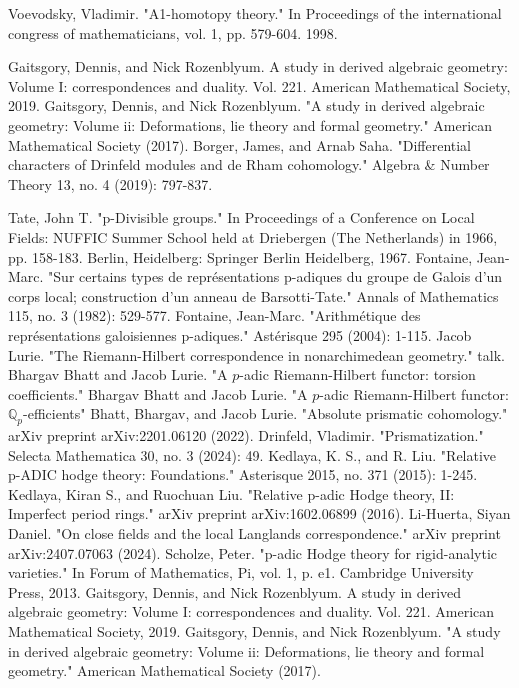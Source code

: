 \documentclass[12pt]{article}
\theoremstyle{definition}
\begin{document}
\begin{thebibliography}{}
 Voevodsky, Vladimir. "A1-homotopy theory." In Proceedings of the international congress of mathematicians, vol. 1, pp. 579-604. 1998.

 Gaitsgory, Dennis, and Nick Rozenblyum. A study in derived algebraic geometry: Volume I: correspondences and duality. Vol. 221. American Mathematical Society, 2019.
 Gaitsgory, Dennis, and Nick Rozenblyum. "A study in derived algebraic geometry: Volume ii: Deformations, lie theory and formal geometry." American Mathematical Society (2017).
 Borger, James, and Arnab Saha. "Differential characters of Drinfeld modules and de Rham cohomology." Algebra \& Number Theory 13, no. 4 (2019): 797-837.


 Tate, John T. "p-Divisible groups." In Proceedings of a Conference on Local Fields: NUFFIC Summer School held at Driebergen (The Netherlands) in 1966, pp. 158-183. Berlin, Heidelberg: Springer Berlin Heidelberg, 1967.
 Fontaine, Jean-Marc. "Sur certains types de repr\'esentations p-adiques du groupe de Galois d'un corps local; construction d'un anneau de Barsotti-Tate." Annals of Mathematics 115, no. 3 (1982): 529-577.
 Fontaine, Jean-Marc. "Arithm\'etique des repr\'esentations galoisiennes p-adiques." Ast\'erisque 295 (2004): 1-115.
 Jacob Lurie. "The Riemann-Hilbert correspondence in nonarchimedean geometry." talk.
 Bhargav Bhatt and Jacob Lurie. "A $p$-adic Riemann-Hilbert functor: torsion coefficients."
 Bhargav Bhatt and Jacob Lurie. "A $p$-adic Riemann-Hilbert functor: $\mathbb{Q}_p$-efficients"
 Bhatt, Bhargav, and Jacob Lurie. "Absolute prismatic cohomology." arXiv preprint arXiv:2201.06120 (2022).
 Drinfeld, Vladimir. "Prismatization." Selecta Mathematica 30, no. 3 (2024): 49.
 Kedlaya, K. S., and R. Liu. "Relative p-ADIC hodge theory: Foundations." Asterisque 2015, no. 371 (2015): 1-245.
 Kedlaya, Kiran S., and Ruochuan Liu. "Relative p-adic Hodge theory, II: Imperfect period rings." arXiv preprint arXiv:1602.06899 (2016).
 Li-Huerta, Siyan Daniel. "On close fields and the local Langlands correspondence." arXiv preprint arXiv:2407.07063 (2024).
 Scholze, Peter. "p-adic Hodge theory for rigid-analytic varieties." In Forum of Mathematics, Pi, vol. 1, p. e1. Cambridge University Press, 2013.
 Gaitsgory, Dennis, and Nick Rozenblyum. A study in derived algebraic geometry: Volume I: correspondences and duality. Vol. 221. American Mathematical Society, 2019.
 Gaitsgory, Dennis, and Nick Rozenblyum. "A study in derived algebraic geometry: Volume ii: Deformations, lie theory and formal geometry." American Mathematical Society (2017).


\end{thebibliography}
\end{document}
